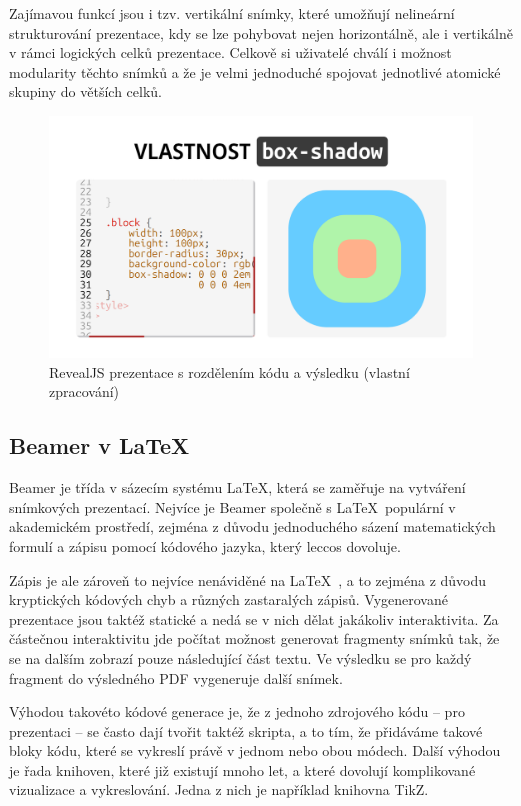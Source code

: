 Zajímavou funkcí jsou i tzv. vertikální snímky, které umožňují nelineární strukturování prezentace, kdy se lze pohybovat nejen horizontálně, ale i vertikálně v rámci logických celků prezentace.
Celkově si uživatelé chválí i možnost modularity těchto snímků a že je velmi jednoduché spojovat jednotlivé atomické skupiny do větších celků.


\begin{figure}[h!]
    \centering
    \includegraphics[width=0.9\linewidth]{media/03_analyza/revealjs.png}
    \caption[RevealJS prezentace s rozdělením kódu a výsledku]{RevealJS prezentace s rozdělením kódu a výsledku (vlastní zpracování)}\label{fig:analyza:revealjs-ukazka}
\end{figure}

\subsection{Beamer v \LaTeX}

Beamer je třída v sázecím systému \LaTeX, která se zaměřuje na vytváření snímkových prezentací.
Nejvíce je Beamer společně s \LaTeX~populární v akademickém prostředí, zejména z důvodu jednoduchého sázení matematických formulí a zápisu pomocí kódového jazyka, který leccos dovoluje. 

Zápis je ale zároveň to nejvíce nenáviděné na \LaTeX~\cite{latex_reddit}, a to zejména z důvodu kryptických kódových chyb a různých zastaralých zápisů.
Vygenerované prezentace jsou taktéž statické a nedá se v nich dělat jakákoliv interaktivita. 
Za částečnou interaktivitu jde počítat možnost generovat fragmenty snímků tak, že se na dalším zobrazí pouze následující část textu.
Ve výsledku se pro každý fragment do výsledného PDF vygeneruje další snímek.

Výhodou takovéto kódové generace je, že z jednoho zdrojového kódu -- pro prezentaci -- se často dají tvořit taktéž skripta, a to tím, že přidáváme takové bloky kódu, které se vykreslí právě v jednom nebo obou módech.
Další výhodou je řada knihoven, které již existují mnoho let, a které dovolují komplikované vizualizace a vykreslování.
Jedna z nich je například knihovna TikZ. 


